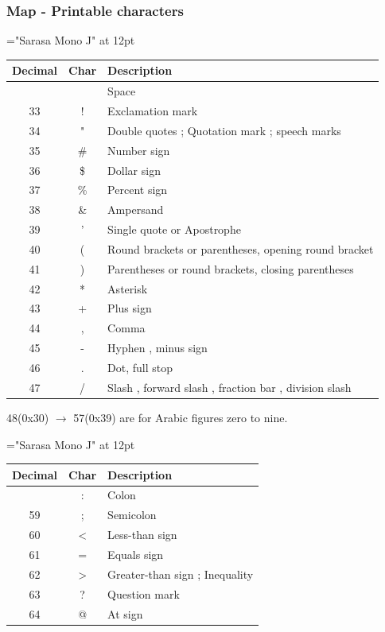 \subsubsection{Map - Printable characters}

{\font\rm="Sarasa Mono J" at 12pt \rm

\begin{longtable}{|c|c|l|}
\hline
\textbf{Decimal} & \textbf{Char} & \textbf{Description} \\
\hline
\endhead
\hline
\endfoot
\hline
\endlastfoot
32 &   & Space \\
\hline
33 & ! & Exclamation mark \\
\hline
34 & " & Double quotes ; Quotation mark ; speech marks \\
\hline
35 & \# & Number sign \\
\hline
36 & \$ & Dollar sign \\
\hline
37 & \% & Percent sign \\
\hline
38 & \& & Ampersand \\
\hline
39 & ' & Single quote or Apostrophe \\
\hline
40 & ( & Round brackets or parentheses, opening round bracket \\
\hline
41 & ) & Parentheses or round brackets, closing parentheses \\
\hline
42 & * & Asterisk \\
\hline
43 & + & Plus sign \\
\hline
44 & , & Comma \\
\hline
45 & - & Hyphen , minus sign \\
\hline
46 & . & Dot, full stop \\
\hline
47 & / & Slash , forward slash , fraction bar , division slash \\
\hline

\end{longtable}

}

48(0x30) $\rightarrow$ 57(0x39) are for Arabic figures zero to nine. 

{\font\rm="Sarasa Mono J" at 12pt \rm

\begin{longtable}{|c|c|l|}
\hline
\textbf{Decimal} & \textbf{Char} & \textbf{Description} \\
\hline
\endhead
\hline
\endfoot
\hline
\endlastfoot
58 & : & Colon \\
\hline
59 & ; & Semicolon \\
\hline
60 & \textless{} & Less-than sign \\
\hline
61 & = & Equals sign \\
\hline
62 & \textgreater{} & Greater-than sign ; Inequality \\
\hline
63 & ? & Question mark \\
\hline
64 & @ & At sign \\
\hline

\end{longtable}

}

